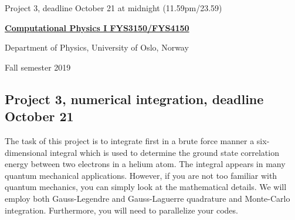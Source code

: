 \documentclass[%
oneside,                 %
final,                   %
10pt]{article}
\begin{document}

\newcommand{\exercisesection}[1]{\subsection*{#1}}






\thispagestyle{empty}

\begin{center}
{\LARGE\bf
\begin{spacing}{1.25}
Project 3, deadline  October 21 at midnight (11.59pm/23.59)
\end{spacing}
}
\end{center}


\begin{center}
{\bf \href{{http://www.uio.no/studier/emner/matnat/fys/FYS3150/index-eng.html}}{Computational Physics I FYS3150/FYS4150}}
\end{center}

    \begin{center}
\centerline{{\small Department of Physics, University of Oslo, Norway}}
\end{center}
    

\begin{center}
Fall semester 2019
\end{center}

\vspace{1cm}


\subsection{Project 3, numerical integration, deadline  October 21}


The task of this project is to integrate first in a brute force manner
a six-dimensional integral which is used to determine the ground state
correlation energy between two electrons in a helium atom.  The
integral appears in many quantum mechanical applications.  However, if
you are not too familiar with quantum mechanics, you can simply look
at the mathematical details.  We will employ both Gauss-Legendre and
Gauss-Laguerre quadrature and Monte-Carlo integration.  Furthermore,
you will need to parallelize your codes.
\end{document}

